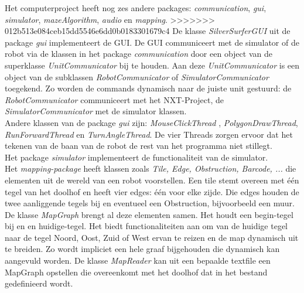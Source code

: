 \documentclass[tt3]{penoverslag}
\begin{document}
Het computerproject heeft nog zes andere packages: \textit{communication}, \textit{gui}, \textit{simulator}, \textit{mazeAlgorithm}, \textit{audio} en \textit{mapping}. 
>>>>>>> 012b513e084ceb15dd5546e6dd0b0183301679c4
De klasse \textit{SilverSurferGUI} uit de package \textit{gui} implementeert de GUI. De GUI communiceert met de simulator of de robot via de klassen in het package \textit{communication} door een object van de superklasse \textit{UnitCommunicator} bij te houden. Aan deze \textit{UnitCommunicator} is een object van de subklassen \textit{RobotCommunicator} of \textit{SimulatorCommunicator}  toegekend. Zo worden de commands dynamisch naar de juiste unit gestuurd: de \textit{RobotCommunicator} communiceert met het NXT-Project, de \textit{SimulatorCommunicator} met de simulator klassen.\\
Andere klassen van de package \textit{gui} zijn: \textit{MouseClickThread} , \textit{PolygonDrawThread}, \textit{RunForwardThread} en \textit{TurnAngleThread}. De vier Threads zorgen ervoor dat het tekenen van de baan van de robot de rest van het programma niet stillegt. \\
Het package \textit{simulator} implementeert de functionaliteit van de simulator. \\
Het \textit{mapping-package} heeft klassen zoals \textit{Tile, Edge, Obstruction, Barcode, ...} die elementen uit de wereld van een robot voorstellen. Een tile stemt overeen met \'e\'en tegel van het doolhof en heeft vier edges: \'e\'en voor elke zijde. Die edges houden de twee aanliggende tegels bij en eventueel een Obstruction, bijvoorbeeld een muur. De klasse \textit{MapGraph} brengt al deze elementen samen. Het houdt een begin-tegel bij en en huidige-tegel. Het biedt functionaliteiten aan om van de huidige tegel naar de tegel Noord, Oost, Zuid of West ervan te reizen en de map dynamisch uit te breiden. Zo wordt impliciet een hele graaf bijgehouden die dynamisch kan aangevuld worden. De klasse \textit{MapReader} kan uit een bepaalde textfile een MapGraph opstellen die overeenkomt met het doolhof dat in het bestand gedefinieerd wordt.
\end{document}
